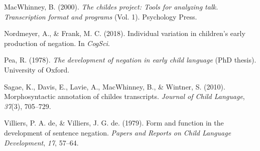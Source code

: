 \documentclass[
  english,
  man,floatsintext]{apa6}
\begin{document}
\leavevmode\hypertarget{ref-macwhinney2000childes}{}%
MacWhinney, B. (2000). \emph{The childes project: Tools for analyzing talk. Transcription format and programs} (Vol. 1). Psychology Press.

\leavevmode\hypertarget{ref-nordmeyer2018individual}{}%
Nordmeyer, A., \& Frank, M. C. (2018). Individual variation in children's early production of negation. In \emph{CogSci}.

\leavevmode\hypertarget{ref-pea1978}{}%
Pea, R. (1978). \emph{The development of negation in early child language} (PhD thesis). University of Oxford.

\leavevmode\hypertarget{ref-sagae2010morphosyntactic}{}%
Sagae, K., Davis, E., Lavie, A., MacWhinney, B., \& Wintner, S. (2010). Morphosyntactic annotation of childes transcripts. \emph{Journal of Child Language}, \emph{37}(3), 705--729.

\leavevmode\hypertarget{ref-de1979form}{}%
Villiers, P. A. de, \& Villiers, J. G. de. (1979). Form and function in the development of sentence negation. \emph{Papers and Reports on Child Language Development}, \emph{17}, 57--64.
\end{document}
